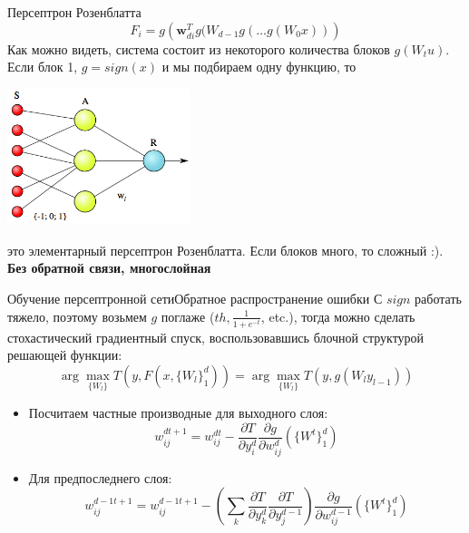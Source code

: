 \documentclass[14pt, fleqn, xcolor={dvipsnames, table}]{beamer}
\begin{document}
\begin{frame}{Персептрон Розенблатта}
\small
$$
F_i = g\left(\mathbf{w}_{di}^T g(W_{d-1}g(\ldots g(W_{0}x))\right)
$$
Как можно видеть, система состоит из некоторого количества блоков $g(W_tu)$. Если блок 1, $g = sign(x)$ и мы подбираем одну функцию, то
\begin{center}
\includegraphics[width=0.4\textwidth]{Simple_perceptron}
\end{center}
это элементарный персептрон Розенблатта. Если блоков много, то сложный :).\\
\textbf{Без обратной связи, многослойная}
\end{frame}

\begin{frame}{Обучение персептронной сети}{Обратное распространение ошибки}
\footnotesize
С $sign$ работать тяжело, поэтому возьмем $g$ поглаже ($th, \frac{1}{1+e^{-t}}$, etc.), тогда можно сделать стохастический градиентный спуск, воспользовавшись блочной структурой решающей функции:
$$
\arg \max_{\{W_l\}} T(y, F(x, \{W_l\}_1^d)) = \arg\max_{\{W_l\}} T(y, g(W_l y_{l-1}))
$$
\begin{itemize}
  \item Посчитаем частные производные для выходного слоя:
  $$
  w_{ij}^{dt+1} = w_{ij}^{dt} - \frac{\partial T}{\partial y_i^d}\frac{\partial g}{\partial w_{ij}^d}\left(\{W^t\}_1^d\right)
  $$
  \item Для предпоследнего слоя:
  $$
  w_{ij}^{d-1t+1}  = w_{ij}^{d-1t+1} - \left(\sum_k \frac{\partial T}{\partial y_k^d}\frac{\partial T}{\partial y_j^{d-1}}\right)\frac{\partial g}{\partial w_{ij}^{d - 1}}\left(\{W^t\}_1^d\right)
  $$
  \end{itemize}
\end{frame}
\end{document}
